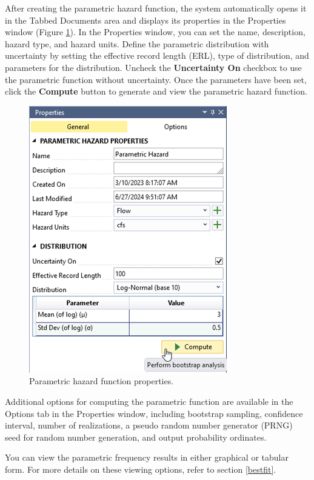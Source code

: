 \documentclass[
]{book}
\begin{document}
After creating the parametric hazard function, the system automatically opens it in the Tabbed Documents area and displays its properties in the Properties window (Figure \ref{fig:figure-63}). In the Properties window, you can set the name, description, hazard type, and hazard units. Define the parametric distribution with uncertainty by setting the effective record length (ERL), type of distribution, and parameters for the distribution. Uncheck the \textbf{Uncertainty On} checkbox to use the parametric function without uncertainty. Once the parameters have been set, click the \textbf{Compute} button to generate and view the parametric hazard function.

\begin{figure}

{\centering \includegraphics{images/figure63} 

}

\caption{Parametric hazard function properties.}\label{fig:figure-63}
\end{figure}

Additional options for computing the parametric function are available in the Options tab in the Properties window, including bootstrap sampling, confidence interval, number of realizations, a pseudo random number generator (PRNG) seed for random number generation, and output probability ordinates.

You can view the parametric frequency results in either graphical or tabular form. For more details on these viewing options, refer to section \ref{bestfit}.
\end{document}
